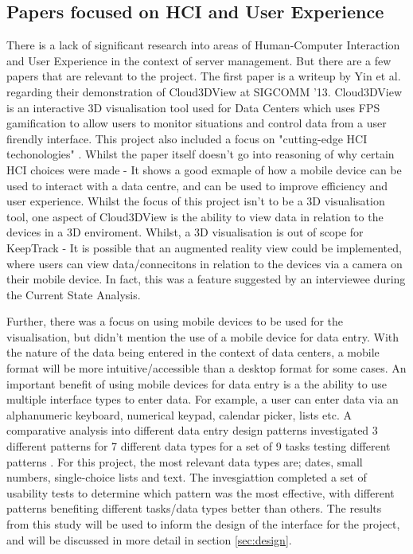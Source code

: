 \documentclass [12pt,letterpaper]{article}
\begin{document}
\subsection{Papers focused on HCI and User Experience}
\label{sec:HCI}
There is a lack of significant research into areas of Human-Computer Interaction and User Experience in the context of server management. But there are a few papers that are relevant to the project. The first paper is a writeup by Yin et al. \cite{cloud3dview} regarding their demonstration of Cloud3DView at SIGCOMM '13. Cloud3DView is an interactive 3D visualisation tool used for Data Centers which uses FPS gamification to allow users to monitor situations and control data from a user firendly interface. This project also included a focus on "cutting-edge HCI techonologies" \cite{cloud3dview}. Whilst the paper itself doesn't go into reasoning of why certain HCI choices were made - It shows a good exmaple of how a mobile device can be used to interact with a data centre, and can be used to improve efficiency and user experience. Whilst the focus of this project isn't to be a 3D visualisation tool, one aspect of Cloud3DView is the ability to view data in relation to the devices in a 3D enviroment. Whilst, a 3D visualisation is out of scope for KeepTrack - It is possible that an augmented reality view could be implemented, where users can view data/connecitons in relation to the devices via a camera on their mobile device. In fact, this was a feature suggested by an interviewee during the Current State Analysis.

Further, there was a focus on using mobile devices to be used for the visualisation, but didn't mention the use of a mobile device for data entry. With the nature of the data being entered in the context of data centers, a mobile format will be more intuitive/accessible than a desktop format for some cases. An important benefit of using mobile devices for data entry is a the ability to use multiple interface types to enter data. For example, a user can enter data via an alphanumeric keyboard, numerical keypad, calendar picker, lists etc. A comparative analysis into different data entry design patterns investigated 3 different patterns for 7 different data types for a set of 9 tasks testing different patterns \cite{myka2019comparative}. For this project, the most relevant data types are; dates, small numbers, single-choice lists and text. The invesgiattion completed a set of usability tests to determine which pattern was the most effective, with different patterns benefiting different tasks/data types better than others.
The results from this study will be used to inform the design of the interface for the project, and will be discussed in more detail in section \ref{sec:design}. 
\end{document}
